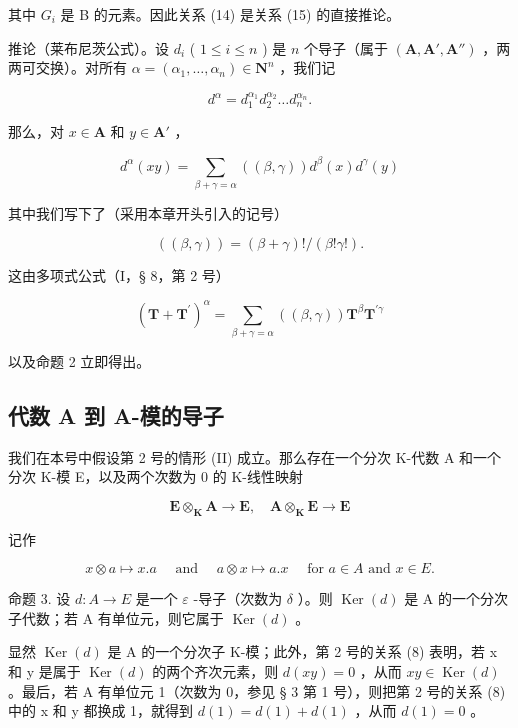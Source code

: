 其中 \(G_{i}\) 是 B 的元素。因此关系 (14) 是关系 (15) 的直接推论。

推论（莱布尼茨公式）。设 \(d_{i}\) ( \(1 \leqslant i \leqslant n\) ) 是 \(n\) 个导子（属于 \((\mathbf{A}, \mathbf{A}', \mathbf{A}'' )\) ，两两可交换）。对所有 \(\alpha = (\alpha_{1}, \ldots, \alpha_{n}) \in \mathbf{N}^{n}\) ，我们记

\[
d ^ {\alpha} = d _ {1} ^ {\alpha_ {1}} d _ {2} ^ {\alpha_ {2}} \dots d _ {n} ^ {\alpha_ {n}}.\tag{16}
\]

那么，对 \(x \in \mathbf{A}\) 和 \(y \in \mathbf{A}'\) ，

\[
d ^ {\alpha} (x y) = \sum_ {\beta + \gamma = \alpha} ((\beta , \gamma)) d ^ {\beta} (x) d ^ {\gamma} (y)\tag{17}
\]

其中我们写下了（采用本章开头引入的记号）

\[
((\beta , \gamma)) = (\beta + \gamma)! / (\beta ! \gamma!).\tag{18}
\]

这由多项式公式（I，§ 8，第 2 号）

\[
(\mathbf {T} + \mathbf {T} ^ {\prime}) ^ {\alpha} = \sum_ {\beta + \gamma = \alpha} ((\beta , \gamma)) \mathbf {T} ^ {\beta} \mathbf {T} ^ {\prime \gamma}
\]

以及命题 2 立即得出。

\subsection{代数 A 到 A-模的导子}

我们在本号中假设第 2 号的情形 (II) 成立。那么存在一个分次 K-代数 A 和一个分次 K-模 E，以及两个次数为 0 的 K-线性映射

\[
\mathbf {E} \otimes_ {\mathbf {K}} \mathbf {A} \rightarrow \mathbf {E}, \quad \mathbf {A} \otimes_ {\mathbf {K}} \mathbf {E} \rightarrow \mathbf {E}
\]

记作

\[
x \otimes a \mapsto x. a \quad \text { and } \quad a \otimes x \mapsto a. x \quad \text { for   } a \in A \text {   and   } x \in E.
\]

命题 3. 设 \(d:A\to E\) 是一个 \(\varepsilon\) -导子（次数为 \(\delta\) ）。则 \(\operatorname{Ker}(d)\) 是 A 的一个分次子代数；若 A 有单位元，则它属于 \(\operatorname{Ker}(d)\) 。

显然 \(\operatorname{Ker}(d)\) 是 A 的一个分次子 K-模；此外，第 2 号的关系 (8) 表明，若 x 和 y 是属于 \(\operatorname{Ker}(d)\) 的两个齐次元素，则 \(d(xy) = 0\) ，从而 \(xy \in \operatorname{Ker}(d)\) 。最后，若 A 有单位元 1（次数为 0，参见 § 3 第 1 号），则把第 2 号的关系 (8) 中的 x 和 y 都换成 1，就得到 \(d(1) = d(1) + d(1)\) ，从而 \(d(1) = 0\) 。


